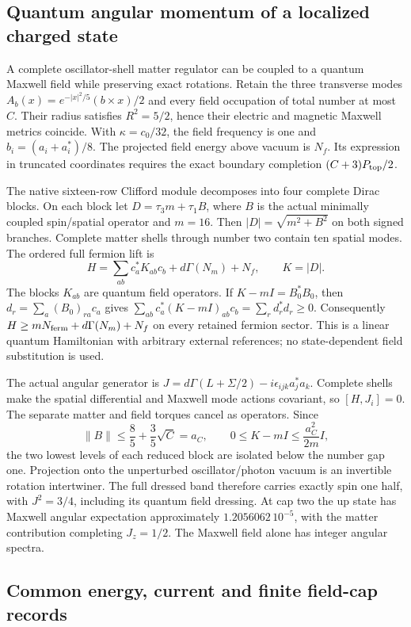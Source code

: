 \subsection{Quantum angular momentum of a localized charged state}

A complete oscillator-shell matter regulator can be coupled to a quantum
Maxwell field while preserving exact rotations. Retain the three transverse
modes $A_b(x)=e^{-|x|^2/5}(b\times x)/2$ and every field occupation of total
number at most $C$. Their radius satisfies $R^2=5/2$, hence their electric
and magnetic Maxwell metrics coincide. With $\kappa=c_0/32$, the field
frequency is one and $b_i=(a_i+a_i^*)/8$. The projected field energy above
vacuum is $N_f$. Its expression in truncated coordinates requires the exact
boundary completion $(C+3)P_{\rm top}/2$.

The native sixteen-row Clifford module decomposes into four complete Dirac
blocks. On each block let $D=\tau_3m+\tau_1B$, where $B$ is the actual
minimally coupled spin/spatial operator and $m=16$. Then
$|D|=\sqrt{m^2+B^2}$ on both signed branches. Complete matter shells through
number two contain ten spatial modes. The ordered full fermion lift is
\[
 H=\sum_{ab}c_a^*K_{ab}c_b+d\Gamma(N_m)+N_f,
 \qquad K=|D|.
\]
The blocks $K_{ab}$ are quantum field operators. If $K-mI=B_0^*B_0$, then
$d_r=\sum_a(B_0)_{ra}c_a$ gives
$\sum_{ab}c_a^*(K-mI)_{ab}c_b=\sum_r d_r^*d_r\ge0$.
Consequently $H\ge mN_{\rm ferm}+d\Gamma(N_m)+N_f$ on every retained
fermion sector. This is a linear quantum Hamiltonian with arbitrary
external references; no state-dependent field substitution is used.

The actual angular generator is
$J=d\Gamma(L+\Sigma/2)-i\epsilon_{ijk}a_j^*a_k$.
Complete shells make the spatial differential and Maxwell mode actions
covariant, so $[H,J_i]=0$. The separate matter and field torques cancel
as operators. Since
\[
 \|B\|\le\frac85+\frac35\sqrt C=a_C,\qquad
 0\le K-mI\le\frac{a_C^2}{2m}I,
\]
the two lowest levels of each reduced block are isolated below the number
gap one. Projection onto the unperturbed oscillator/photon vacuum is an
invertible rotation intertwiner. The full dressed band therefore carries
exactly spin one half, with $J^2=3/4$, including its quantum field dressing.
At cap two the up state has Maxwell angular expectation approximately
$1.2056062\,10^{-5}$, with the matter contribution completing $J_z=1/2$.
The Maxwell field alone has integer angular spectra.

\subsection{Common energy, current and finite field-cap records}

